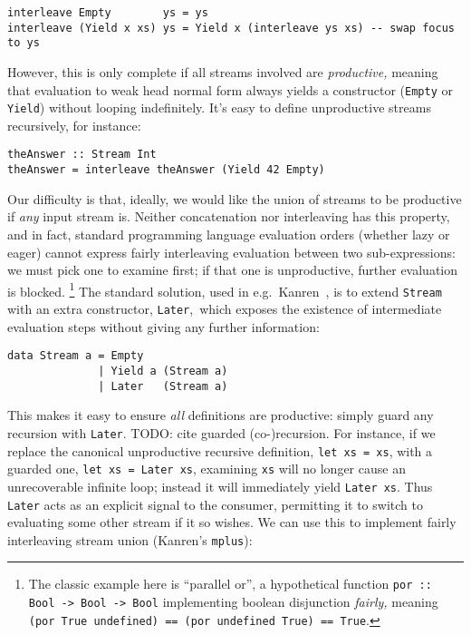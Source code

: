 \documentclass[acmsmall,screen,review,anonymous,dvipsnames,svgnames]{acmart}
\newcommand\hask[1]{\texttt{#1}}
\newcommand\ttt\texttt
\newcommand\todo[1]{{\color{Orange}#1}}
\begin{document}
\begin{verbatim}
interleave Empty        ys = ys
interleave (Yield x xs) ys = Yield x (interleave ys xs) -- swap focus to ys
\end{verbatim}

\noindent
However, this is only complete if all streams involved are \emph{productive,} meaning that evaluation to weak head normal form always yields a constructor (\hask{Empty} or \hask{Yield}) without looping indefinitely.
It's easy to define unproductive streams recursively, for instance:

\begin{verbatim}
theAnswer :: Stream Int
theAnswer = interleave theAnswer (Yield 42 Empty)
\end{verbatim}


\noindent
Our difficulty is that, ideally, we would like the union of streams to be productive if \emph{any} input stream is.
Neither concatenation nor interleaving has this property, and in fact, standard programming language evaluation orders (whether lazy or eager) cannot express fairly interleaving evaluation between two sub-expressions: we must pick one to examine first; if that one is unproductive, further evaluation is blocked.%
\footnote{The classic example here is ``parallel or'', a hypothetical function \hask{por :: Bool -> Bool -> Bool} implementing boolean disjunction \emph{fairly,} meaning \hask{(por True undefined) == (por undefined True) == True}.}
%
The standard solution, used in e.g.~\textmu{}Kanren~\citep{muKanren}, is to extend \hask{Stream} with an extra constructor, \hask{Later},\footnotemark\ which exposes the existence of intermediate evaluation steps without giving any further information:

\begin{verbatim}
data Stream a = Empty
              | Yield a (Stream a)
              | Later   (Stream a)
\end{verbatim}

\noindent
This makes it easy to ensure \emph{all} definitions are productive: simply guard any recursion with \hask{Later}.
\todo{TODO: cite guarded (co-)recursion.}
For instance, if we replace the canonical unproductive recursive definition, \hask{let xs = xs}, with a guarded one, \hask{let xs = Later xs}, examining \ttt{xs} will no longer cause an unrecoverable infinite loop; instead it will immediately yield \hask{Later xs}.
Thus \hask{Later} acts as an explicit signal to the consumer, permitting it to switch to evaluating some other stream if it so wishes.
We can use this to implement fairly interleaving stream union (\textmu{}Kanren's \ttt{mplus}):
\end{document}
